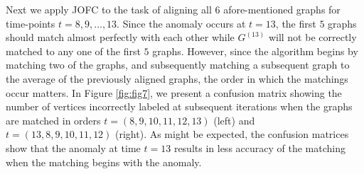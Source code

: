 \documentclass[12pt]{article}
\numberwithin{equation}{section}
\theoremstyle{definition}
\begin{document}
Next we apply JOFC to the task of aligning all $6$ afore-mentioned graphs for
time-points $t=8,9,\ldots,13$. Since the anomaly occurs at $t=13$, the
first $5$ graphs should match almost perfectly with each other while
$G^{(13)}$ will not be correctly matched to any one of the first $5$
graphs. However, since the algorithm begins by matching two of the
graphs, and subsequently matching a subsequent graph to the average of
the previously aligned graphs, the order in which the matchings occur
matters. In Figure \ref{fig:fig7}, we present a confusion matrix showing
the number of vertices incorrectly labeled at subsequent iterations when
the graphs are matched in orders $t=(8,9,10,11,12,13)$ (left) and 
$t=(13,8,9,10,11,12)$ (right). As might be expected, the confusion
matrices show that the anomaly at time $t=13$ results in less accuracy
of the matching when the matching begins with the anomaly. 
\end{document}
